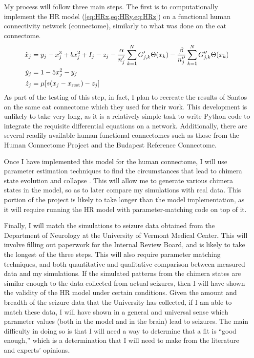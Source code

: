 My process will follow three main steps.
The first is to computationally implement the HR model (\cref{eq:HRx,eq:HRy,eq:HRz}) on a functional human connectivity network (connectome), similarly to what was done on the cat connectome.
\begin{align}
  \label{eq:HRx}
  \dot{x}_{j} &= y_{j} - x_{j}^{3} + b x_{j}^{2} + I_{j} - z_{j}
                -
                \frac{\alpha}{n'_{j}} \sum_{k = 1}^{N}{G'_{j, k} \Theta(x_{k})}
                -
                \frac{\beta}{n''_{j}} \sum_{k = 1}^{N}{G''_{j, k} \Theta(x_{k})} \\
  \label{eq:HRy}
  \dot{y}_{j} &= 1 - 5 x_{j}^{2} - y_{j} \\
  \label{eq:HRz}
  \dot{z}_{j} &= \mu \bqty{s \pqty{x_{j} - x_{\text{rest}}} - z_{j}}
\end{align}
As part of the testing of this step, in fact, I plan to recreate the results of Santos \etal on the same cat connectome which they used for their work.
This development is unlikely to take very long, as it is a relatively simple task to write Python code to integrate the requisite differential equations on a network.
Additionally, there are several readily available human functional connectomes such as those from the Human Connectome Project and the Budapest Reference Connectome.

Once I have implemented this model for the human connectome, I will use parameter estimation techniques to find the circumstances that lead to chimera state evolution and collapse \autocite{Ramsay2007}.
This will allow me to generate various chimera states in the model, so as to later compare my simulations with real data.
This portion of the project is likely to take longer than the model implementation, as it will require running the HR model with parameter-matching code on top of it.

Finally, I will match the simulations to seizure data obtained from the Department of Neurology at the University of Vermont Medical Center.
This will involve filling out paperwork for the Internal Review Board, and is likely to take the longest of the three steps.
This will also require parameter matching techniques, and both quantitative and qualitative comparison between measured data and my simulations.
If the simulated patterns from the chimera states are similar enough to the data collected from actual seizures, then I will have shown the validity of the HR model under certain conditions.
Given the amount and breadth of the seizure data that the University has collected, if I am able to match these data, I will have shown in a general and universal sense which parameter values (both in the model and in the brain) lead to seizures.
The main difficulty in doing so is that I will need a way to determine that a fit is ``good enough,'' which is a determination that I will need to make from the literature and experts' opinions.


